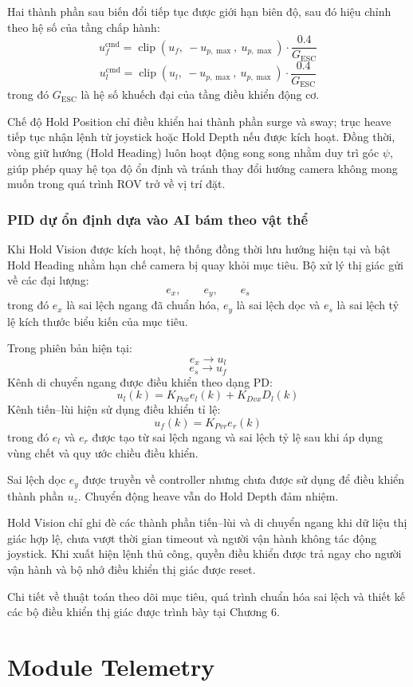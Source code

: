 \documentclass[../DoAn.tex]{subfiles}
\begin{document}
Hai thành phần sau biến đổi tiếp tục được giới hạn biên độ, sau đó hiệu chỉnh theo hệ số của tầng chấp hành:
\[
u_f^{\mathrm{cmd}} = \operatorname{clip}\left(u_f,\ -u_{p,\max},\ u_{p,\max}\right) \cdot \frac{0.4}{G_{\mathrm{ESC}}}
\]
\[
u_l^{\mathrm{cmd}} = \operatorname{clip}\left(u_l,\ -u_{p,\max},\ u_{p,\max}\right) \cdot \frac{0.4}{G_{\mathrm{ESC}}}
\]
trong đó $G_{\mathrm{ESC}}$ là hệ số khuếch đại của tầng điều khiển động cơ.

Chế độ Hold Position chỉ điều khiển hai thành phần surge và sway; trục heave tiếp tục nhận lệnh từ joystick hoặc Hold Depth nếu được kích hoạt. Đồng thời, vòng giữ hướng (Hold Heading) luôn hoạt động song song nhằm duy trì góc $\psi$, giúp phép quay hệ tọa độ ổn định và tránh thay đổi hướng camera không mong muốn trong quá trình ROV trở về vị trí đặt.

\subsubsection{PID dự ổn định dựa vào AI bám theo vật thể}
Khi Hold Vision được kích hoạt, hệ thống đồng thời lưu hướng hiện tại và bật Hold Heading nhằm hạn chế camera bị quay khỏi mục tiêu. Bộ xử lý thị giác gửi về các đại lượng:
\[
e_x, \qquad e_y, \qquad e_s
\]
trong đó $e_x$ là sai lệch ngang đã chuẩn hóa, $e_y$ là sai lệch dọc và $e_s$ là sai lệch tỷ lệ kích thước biểu kiến của mục tiêu.

Trong phiên bản hiện tại:
\[
e_x \rightarrow u_l
\]
\[
e_s \rightarrow u_f
\]
Kênh di chuyển ngang được điều khiển theo dạng PD:
\[
u_l(k) = K_{Pvx}e_l(k) + K_{Dvx}D_l(k)
\]
Kênh tiến--lùi hiện sử dụng điều khiển tỉ lệ:
\[
u_f(k) = K_{Pvr}e_r(k)
\]
trong đó $e_l$ và $e_r$ được tạo từ sai lệch ngang và sai lệch tỷ lệ sau khi áp dụng vùng chết và quy ước chiều điều khiển.

Sai lệch dọc $e_y$ được truyền về controller nhưng chưa được sử dụng để điều khiển thành phần $u_z$. Chuyển động heave vẫn do Hold Depth đảm nhiệm.

Hold Vision chỉ ghi đè các thành phần tiến--lùi và di chuyển ngang khi dữ liệu thị giác hợp lệ, chưa vượt thời gian timeout và người vận hành không tác động joystick. Khi xuất hiện lệnh thủ công, quyền điều khiển được trả ngay cho người vận hành và bộ nhớ điều khiển thị giác được reset.

Chi tiết về thuật toán theo dõi mục tiêu, quá trình chuẩn hóa sai lệch và thiết kế các bộ điều khiển thị giác được trình bày tại Chương 6.


\section{Module Telemetry}
\end{document}
